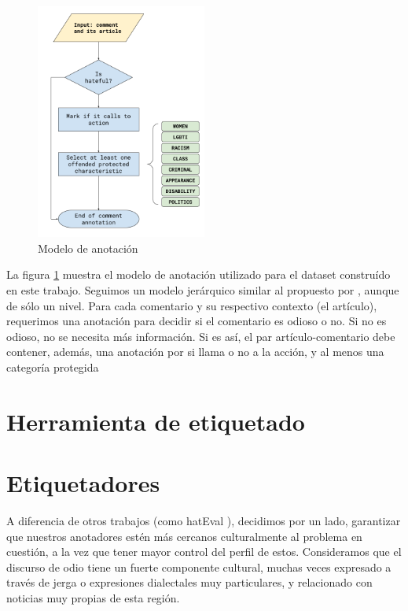 %
%
%



\begin{figure}
    \centering
    \includegraphics[width=0.5\textwidth]{img/Annotation Model.png}
    \caption{Modelo de anotación}
    \label{fig:annotation_model}
\end{figure}


La figura \ref{fig:annotation_model} muestra el modelo de anotación utilizado para el dataset construído en este trabajo. Seguimos un modelo jerárquico similar al propuesto por \citet{zampieri2019predicting}, aunque de sólo un nivel. Para cada comentario y su respectivo contexto (el artículo), requerimos una anotación  para decidir si el comentario es odioso o no. Si no es odioso, no se necesita más información. Si es así, el par artículo-comentario debe contener, además, una anotación por si llama o no a la acción, y al menos una categoría protegida



\section{Herramienta de etiquetado}


\section{Etiquetadores}

A diferencia de otros trabajos (como hatEval \cite{hateval2019semeval}), decidimos por un lado, garantizar que nuestros anotadores estén más cercanos culturalmente al problema en cuestión, a la vez que tener mayor control del perfil de estos. Consideramos que el discurso de odio tiene un fuerte componente cultural, muchas veces expresado a través de jerga o expresiones dialectales muy particulares, y relacionado con noticias muy propias de esta región.


